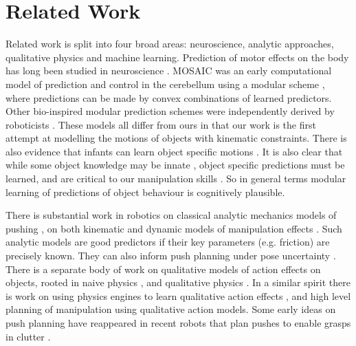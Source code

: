 \section{Related Work}\label{sec:Background}

Related work is split into four broad areas: neuroscience, analytic approaches, qualitative physics and machine learning. Prediction of motor effects on the body has long been studied in neuroscience \citep{Miall1996,flanagan03}.  MOSAIC was an early computational model of prediction and control in the cerebellum using a modular scheme \citep{Haruno_MOSAIC_2008}, where predictions can be made by convex combinations of learned predictors. Other bio-inspired modular prediction schemes were independently derived by roboticists \citep{demiris2006hierarchical}. These models all differ from ours in that our work is the first attempt at modelling the motions of objects with kinematic constraints. There is also evidence that infants can learn object specific motions \citep{Bahrick1995}. It is also clear that while some object knowledge may be innate \citep{spelke1994early}, object specific predictions must be learned, and are critical to our manipulation skills \citep{flanagan06}. So in general terms modular learning of predictions of object behaviour is cognitively plausible.

There is substantial work in robotics on classical analytic mechanics models of pushing \citep{mason_manipulator_1982,lynch_mechanics_1992,peshkin_motion_1988,cappelleri_designing_2006}, on both kinematic and dynamic models of manipulation effects \citep{mason_mechanics_2001}. Such analytic models are good predictors if their key parameters (e.g. friction) are precisely known. They can also inform push planning under pose uncertainty \citep{brost1985planning}. There is a separate body of work on qualitative models of action effects on objects, rooted in naive physics \citep{hayes1995second}, and qualitative physics \citep{kuipers1986qualitative}. In a similar spirit there is work on using physics engines to learn qualitative action effects \citep{Mugan-tamd-12}, and high level planning of manipulation \citep{stillman08ijrr,roy2004mental} using qualitative action models. Some early ideas on push planning have reappeared in recent robots that plan pushes to enable grasps in clutter \citep{Dogar_2010}.

